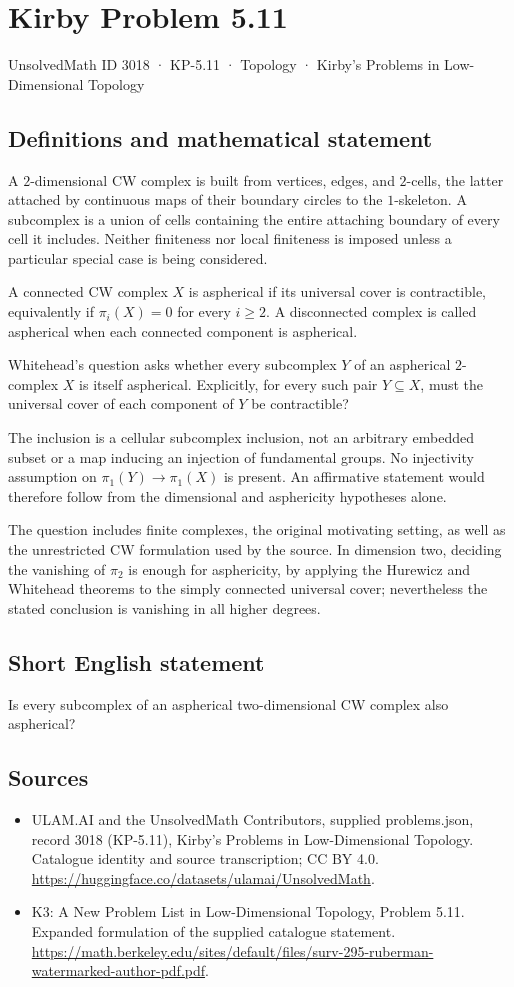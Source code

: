 \documentclass[11pt,a4paper]{article}
\begin{document}
\section*{Kirby Problem 5.11}\label{3018}
{\small UnsolvedMath ID 3018 · KP-5.11 · Topology · Kirby's Problems in Low-Dimensional Topology}
\subsection{Definitions and mathematical statement}
A $2$-dimensional CW complex is built from vertices, edges,
and $2$-cells, the latter attached by continuous maps of their
boundary circles to the $1$-skeleton. A subcomplex is a union
of cells containing the entire attaching boundary of every cell
it includes. Neither finiteness nor local finiteness is imposed
unless a particular special case is being considered.

A connected CW complex $X$ is aspherical if its universal
cover is contractible, equivalently if $\pi_i(X)=0$ for every
$i\ge2$. A disconnected complex is called aspherical when
each connected component is aspherical.

Whitehead's question asks whether every subcomplex $Y$ of an
aspherical $2$-complex $X$ is itself aspherical. Explicitly,
for every such pair $Y\subseteq X$, must the universal cover
of each component of $Y$ be contractible?

The inclusion is a cellular subcomplex inclusion, not an
arbitrary embedded subset or a map inducing an injection of
fundamental groups. No injectivity assumption on
$\pi_1(Y)\to\pi_1(X)$ is present. An affirmative statement
would therefore follow from the dimensional and asphericity
hypotheses alone.

The question includes finite complexes, the original motivating
setting, as well as the unrestricted CW formulation used by
the source. In dimension two, deciding the vanishing of
$\pi_2$ is enough for asphericity, by applying the Hurewicz
and Whitehead theorems to the simply connected universal
cover; nevertheless the stated conclusion is vanishing in
all higher degrees.
\subsection{Short English statement}
Is every subcomplex of an aspherical two-dimensional CW complex also aspherical?
\subsection{Sources}
\begin{itemize}
\item[S1] ULAM.AI and the UnsolvedMath Contributors, supplied problems.json, record 3018 (KP-5.11), Kirby's Problems in Low-Dimensional Topology. Catalogue identity and source transcription; CC BY 4.0.
\url{https://huggingface.co/datasets/ulamai/UnsolvedMath}.
\item[S2] K3: A New Problem List in Low-Dimensional Topology, Problem 5.11. Expanded formulation of the supplied catalogue statement.
\url{https://math.berkeley.edu/sites/default/files/surv-295-ruberman-watermarked-author-pdf.pdf}.
\end{itemize}
\end{document}
